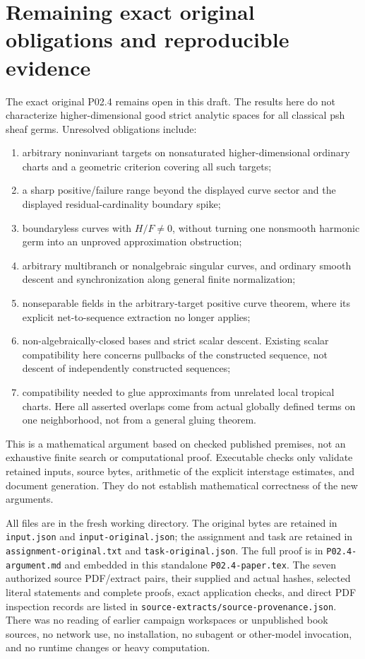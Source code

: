 \documentclass[11pt]{article}
\theoremstyle{remark}
\begin{document}
\section{Remaining exact original obligations and reproducible evidence}
The exact original P02.4 remains open in this draft. The results here do
not characterize higher-dimensional good strict analytic spaces for all
classical psh sheaf germs. Unresolved obligations include:
\begin{enumerate}
\item arbitrary noninvariant targets on nonsaturated higher-dimensional
ordinary charts and a geometric criterion covering all such targets;
\item a sharp positive/failure range beyond the displayed curve sector
and the displayed residual-cardinality boundary spike;
\item boundaryless curves with $H/F\ne0$, without turning one nonsmooth
harmonic germ into an unproved approximation obstruction;
\item arbitrary multibranch or nonalgebraic singular curves, and
ordinary smooth descent and synchronization along general finite normalization;
\item nonseparable fields in the arbitrary-target positive curve theorem,
where its explicit net-to-sequence extraction no longer applies;
\item non-algebraically-closed bases and strict scalar descent. Existing
scalar compatibility here concerns pullbacks of the constructed sequence,
not descent of independently constructed sequences;
\item compatibility needed to glue approximants from unrelated local
tropical charts. Here all asserted overlaps come from actual globally
defined terms on one neighborhood, not from a general gluing theorem.
\end{enumerate}

This is a mathematical argument based on checked published premises,
not an exhaustive finite search or computational proof. Executable
checks only validate retained inputs, source bytes, arithmetic of the
explicit interstage estimates, and document generation. They do not
establish mathematical correctness of the new arguments.

All files are in the fresh working directory. The original bytes are
retained in \texttt{input.json} and \texttt{input-original.json}; the
assignment and task are retained in \texttt{assignment-original.txt}
and \texttt{task-original.json}. The full proof is in
\texttt{P02.4-argument.md} and embedded in this standalone
\texttt{P02.4-paper.tex}. The seven authorized source PDF/extract pairs,
their supplied and actual hashes, selected literal statements and complete
proofs, exact application checks, and direct PDF inspection records are
listed in \texttt{source-extracts/source-provenance.json}.
There was no reading of earlier campaign workspaces or unpublished book
sources, no network use, no installation, no subagent or other-model
invocation, and no runtime changes or heavy computation.
\end{document}
